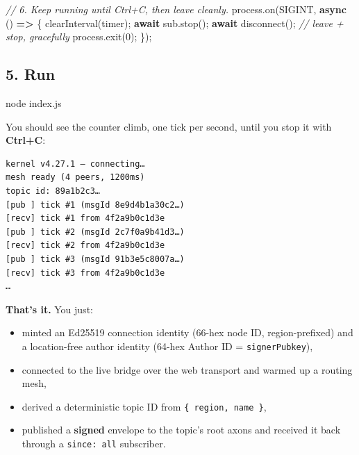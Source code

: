 \documentclass[
  nobib]{tufte-handout}
\newenvironment{Shaded}{}{}
\newcommand{\BuiltInTok}[1]{\textcolor[rgb]{0.00,0.50,0.00}{#1}}
\newcommand{\CommentTok}[1]{\textcolor[rgb]{0.38,0.63,0.69}{\textit{#1}}}
\newcommand{\ControlFlowTok}[1]{\textcolor[rgb]{0.00,0.44,0.13}{\textbf{#1}}}
\newcommand{\DecValTok}[1]{\textcolor[rgb]{0.25,0.63,0.44}{#1}}
\newcommand{\ExtensionTok}[1]{#1}
\newcommand{\FunctionTok}[1]{\textcolor[rgb]{0.02,0.16,0.49}{#1}}
\newcommand{\KeywordTok}[1]{\textcolor[rgb]{0.00,0.44,0.13}{\textbf{#1}}}
\newcommand{\NormalTok}[1]{#1}
\newcommand{\OperatorTok}[1]{\textcolor[rgb]{0.40,0.40,0.40}{#1}}
\newcommand{\PreprocessorTok}[1]{\textcolor[rgb]{0.74,0.48,0.00}{#1}}
\newcommand{\StringTok}[1]{\textcolor[rgb]{0.25,0.44,0.63}{#1}}
\providecommand{\tightlist}{%
  \setlength{\itemsep}{0pt}\setlength{\parskip}{0pt}}
\begin{document}
\begin{Shaded}
\begin{Highlighting}[]
\CommentTok{// 6. Keep running until Ctrl+C, then leave cleanly.}
\BuiltInTok{process}\OperatorTok{.}\FunctionTok{on}\NormalTok{(}\StringTok{\textquotesingle{}SIGINT\textquotesingle{}}\OperatorTok{,} \KeywordTok{async}\NormalTok{ () }\KeywordTok{=\textgreater{}}\NormalTok{ \{}
  \PreprocessorTok{clearInterval}\NormalTok{(timer)}\OperatorTok{;}
  \ControlFlowTok{await}\NormalTok{ sub}\OperatorTok{.}\FunctionTok{stop}\NormalTok{()}\OperatorTok{;}
  \ControlFlowTok{await} \FunctionTok{disconnect}\NormalTok{()}\OperatorTok{;}          \CommentTok{// leave + stop, gracefully}
  \BuiltInTok{process}\OperatorTok{.}\FunctionTok{exit}\NormalTok{(}\DecValTok{0}\NormalTok{)}\OperatorTok{;}
\NormalTok{\})}\OperatorTok{;}
\end{Highlighting}
\end{Shaded}

\subsection{5. Run}\label{run}

\begin{Shaded}
\begin{Highlighting}[]
\ExtensionTok{node}\NormalTok{ index.js}
\end{Highlighting}
\end{Shaded}

You should see the counter climb, one tick per second, until you stop it
with \textbf{Ctrl+C}:

\begin{verbatim}
kernel v4.27.1 — connecting…
mesh ready (4 peers, 1200ms)
topic id: 89a1b2c3…
[pub ] tick #1 (msgId 8e9d4b1a30c2…)
[recv] tick #1 from 4f2a9b0c1d3e
[pub ] tick #2 (msgId 2c7f0a9b41d3…)
[recv] tick #2 from 4f2a9b0c1d3e
[pub ] tick #3 (msgId 91b3e5c8007a…)
[recv] tick #3 from 4f2a9b0c1d3e
…
\end{verbatim}

\textbf{That's it.} You just:

\begin{itemize}
\tightlist
\item
  minted an Ed25519 connection identity (66-hex node ID,
  region-prefixed) and a location-free author identity (64-hex Author ID
  = \texttt{signerPubkey}),
\item
  connected to the live bridge over the web transport and warmed up a
  routing mesh,
\item
  derived a deterministic topic ID from \texttt{\{\ region,\ name\ \}},
\item
  published a \textbf{signed} envelope to the topic's root axons and
  received it back through a
  \texttt{since:\ \textquotesingle{}all\textquotesingle{}} subscriber.
\end{itemize}
\end{document}

